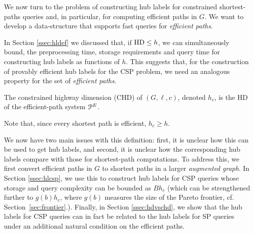 We now turn to the problem of constructing hub labels for constrained shortest-paths queries and, in particular, for computing efficient paths in $G$. 
We want to develop a data-structure that supports fast queries for \emph{efficient paths}. 

In Section \ref{ssec:hldef} we discussed that, if $\operatorname{HD}\leq h$, we can simultaneously bound, the preprocessing time, storage requirements and query time for constructing hub labels as functions of $h$.
This suggests that, for the construction of provably efficient hub labels for the CSP problem, we need an analogous property for the set of \emph{efficient paths}.
\begin{definition} The constrained highway dimension (CHD) of $(G,\ell,c)$, denoted $h_c$, is the HD of the efficient-path system $\mathcal{P}^E$.
\end{definition}
Note that, since every shortest path is efficient, $h_c\geq h$.

We now have two main issues with this definition: first, it is unclear how this can be used to get hub labels, and second, it is unclear how the corresponding hub labels compare with those for shortest-path computations. 
To address this, we first convert efficient paths in $G$ to shortest paths in a larger \emph{augmented graph}. 
In Section \ref{ssec:hlcsp}, we use this to construct hub labels for CSP queries whose storage and query complexity can be bounded as $Bh_c$ (which can be strengthened further to $g(b)h_c$, where $g(b)$ measures the size of the Pareto frontier, cf. Section~\ref{sec:frontier}.). 
Finally, in Section \ref{ssec:hdvschd}, we show that the hub labels for CSP queries can in fact be related to the hub labels for SP queries under an additional natural condition on the efficient paths.